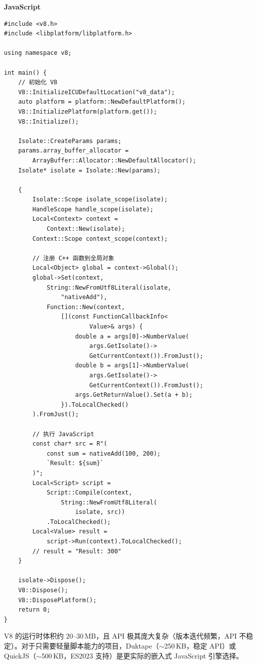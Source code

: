 \documentclass[12pt,a4paper,fontset=fandol]{ctexbook}
\newenvironment{warning}[1][]{%
  \begin{tcolorbox}[enhanced,breakable,
    colback=red!5!white,colframe=red!75!black,
    boxed title style={colback=red!75!black},
    attach boxed title to top left={yshift=-2mm,xshift=2mm},
    arc=2mm,boxrule=0.8mm,
    title={常见陷阱},#1]}%
  {\end{tcolorbox}}
\newcommand{\jslabel}{%
  \noindent\begin{tcolorbox}[colback=jsheadbg!80!black,coltext=white,
    sharp corners,boxrule=0pt,width=6.0em,height=1.4em,
    halign=center,valign=center,nobeforeafter,left=0pt,right=0pt,
    top=0pt,bottom=0pt]\small\bfseries JavaScript\end{tcolorbox}}
\begin{document}
\jslabel
\begin{lstlisting}[style=cppstyle]
#include <v8.h>
#include <libplatform/libplatform.h>

using namespace v8;

int main() {
    // 初始化 V8
    V8::InitializeICUDefaultLocation("v8_data");
    auto platform = platform::NewDefaultPlatform();
    V8::InitializePlatform(platform.get());
    V8::Initialize();

    Isolate::CreateParams params;
    params.array_buffer_allocator =
        ArrayBuffer::Allocator::NewDefaultAllocator();
    Isolate* isolate = Isolate::New(params);

    {
        Isolate::Scope isolate_scope(isolate);
        HandleScope handle_scope(isolate);
        Local<Context> context =
            Context::New(isolate);
        Context::Scope context_scope(context);

        // 注册 C++ 函数到全局对象
        Local<Object> global = context->Global();
        global->Set(context,
            String::NewFromUtf8Literal(isolate,
                "nativeAdd"),
            Function::New(context,
                [](const FunctionCallbackInfo<
                        Value>& args) {
                    double a = args[0]->NumberValue(
                        args.GetIsolate()->
                        GetCurrentContext()).FromJust();
                    double b = args[1]->NumberValue(
                        args.GetIsolate()->
                        GetCurrentContext()).FromJust();
                    args.GetReturnValue().Set(a + b);
                }).ToLocalChecked()
        ).FromJust();

        // 执行 JavaScript
        const char* src = R"(
            const sum = nativeAdd(100, 200);
            `Result: ${sum}`
        )";
        Local<Script> script =
            Script::Compile(context,
                String::NewFromUtf8Literal(
                    isolate, src))
            .ToLocalChecked();
        Local<Value> result =
            script->Run(context).ToLocalChecked();
        // result = "Result: 300"
    }

    isolate->Dispose();
    V8::Dispose();
    V8::DisposePlatform();
    return 0;
}
\end{lstlisting}

\begin{warning}[title={V8 的嵌入代价}]
V8 的运行时体积约 20--30\,MB，且 API 极其庞大复杂（版本迭代频繁，API 不稳定）。对于只需要轻量脚本能力的项目，Duktape（$\sim$250\,KB，稳定 API）或 QuickJS（$\sim$500\,KB，ES2023 支持）是更实际的嵌入式 JavaScript 引擎选择。
\end{warning}
\end{document}

